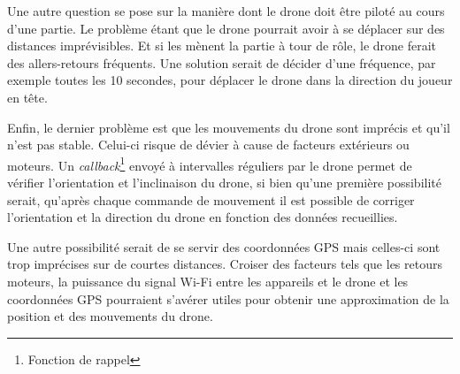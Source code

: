 Une autre question se pose sur la manière dont le drone doit être piloté au cours d'une partie. Le problème étant que le drone pourrait avoir à se déplacer sur des distances imprévisibles. Et si les mènent la partie à tour de rôle, le drone ferait des allers-retours fréquents. Une solution serait de décider d'une fréquence, par exemple toutes les 10 secondes, pour déplacer le drone dans la direction du joueur en tête.

Enfin, le dernier problème est que les mouvements du drone sont imprécis et qu'il n'est pas stable. Celui-ci risque de dévier à cause de facteurs extérieurs ou moteurs. Un \textit{callback}\footnote{Fonction de rappel} envoyé à intervalles réguliers par le drone permet de vérifier l'orientation et l'inclinaison du drone, si bien qu'une première possibilité serait, qu'après chaque commande de mouvement il est possible de corriger l'orientation et la direction du drone en fonction des données recueillies.

Une autre possibilité serait de se servir des coordonnées GPS mais celles-ci sont trop imprécises sur de courtes distances. Croiser des facteurs tels que les retours moteurs, la puissance du signal Wi-Fi entre les appareils et le drone et les coordonnées GPS pourraient s'avérer utiles pour obtenir une approximation de la position et des mouvements du drone.
